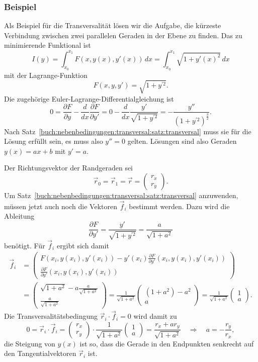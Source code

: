 %
%
\subsubsection{Beispiel}
Als Beispiel für die Transversalität lösen wir die Aufgabe, die kürzeste
Verbindung zwischen zwei parallelen Geraden in der Ebene zu finden.
Das zu minimierende Funktional ist 
\[
I(y)
=
\int_{x_0}^{x_1} F(x,y(x),y'(x))\,dx
=
\int_{x_0}^{x_1} \sqrt{1+y'(x)^2}\,dx
\]
mit der Lagrange-Funktion
\[
F(x,y,y')
=
\sqrt{1+y^{\prime 2}}.
\]
Die zugehörige Euler-Lagrange-Differentialgleichung ist 
\[
0
=
\frac{\partial F}{\partial y} - \frac{d}{dx}\frac{\partial F}{\partial y'}
=
0
-
\frac{d}{dx}
\frac{y'}{\sqrt{1+y^{\prime 2}}}
=
-
\frac{y''}{(1+y^{\prime 2})^{\frac32}}.
\]
Nach Satz~\ref{buch:nebenbedingungen:transversal:satz:transversal}
muss sie für die Lösung erfüllt sein, es muss also $y''=0$ gelten.
Lösungen sind also Geraden $y(x)=ax+b$ mit $y'=a$.

Der Richtungsvektor der Randgeraden sei
\[
\vec{r}_0
=
\vec{r}_1
=
\vec{r}
=
\begin{pmatrix}r_x\\r_y\end{pmatrix}.
\]
Um Satz~\ref{buch:nebenbedingungen:transversal:satz:transversal}
anzuwenden, müssen jetzt auch noch die Vektoren $\vec{f}_i$ bestimmt
werden.
Dazu wird die Ableitung
\[
\frac{\partial F}{\partial y'}
=
\frac{y'}{\sqrt{1+y^{\prime 2}}}
=
\frac{a}{\sqrt{1+a^2}}
\]
benötigt.
Für $\vec{f}_i$ ergibt sich damit
\begin{align*}
\vec{f}_i
&=
\begin{pmatrix}
\displaystyle
F(x_i,y(x_i),y'(x_i))
-
y'(x_i)
\frac{\partial F}{\partial y'}(x_i,y(x_i),y'(x_i))
\\[3pt]
\displaystyle
\frac{\partial F}{\partial y'}(x_i,y(x_i),y'(x_i))
\end{pmatrix}
\\
&=
\begin{pmatrix}
\displaystyle
\sqrt{1+a^2} -a\frac{a}{\sqrt{1+a^2}}
\\[3pt]
\displaystyle
\frac{a}{\sqrt{1+a^2}}
\end{pmatrix}
=
\frac{1}{\sqrt{1+a^2}}
\begin{pmatrix}
(1+a^2) -a^2\\
a
\end{pmatrix}
=
\frac{1}{\sqrt{1+a^2}}
\begin{pmatrix}
1\\
a
\end{pmatrix}.
\end{align*}
Die Transversalitätsbedingung $\vec{r}_i\cdot\vec{f}_i=0$ wird damit zu
\[
0
=
\vec{r}_i\cdot\vec{f}_i
=
\begin{pmatrix}
r_x\\r_y
\end{pmatrix}
\cdot
\frac{1}{\sqrt{1+a^2}}
\begin{pmatrix}
1\\
a
\end{pmatrix}
=
\frac{r_x+ar_y}{\sqrt{1+a^2}}
\quad\Rightarrow\quad
a
=
-\frac{r_y}{r_x},
\]
die Steigung von $y(x)$ ist so, dass die Gerade in den Endpunkten senkrecht
auf den Tangentialvektoren $\vec{r}_i$ ist.

